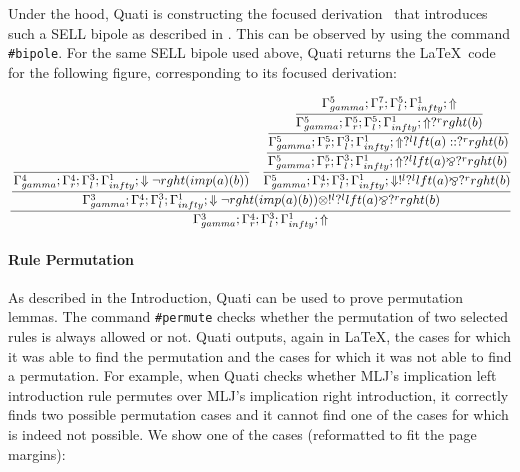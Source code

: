 \documentclass{llncs}
\begin{document}
Under the hood, Quati is constructing the focused derivation~\cite{andreoli92jlc} that introduces such 
a SELL bipole as described in \cite{nigam.jlc}. This can be observed by using the command 
\texttt{\#bipole}. For the same SELL bipole used above, Quati returns
the \LaTeX\ code for the following figure, corresponding to its focused
derivation:
\vspace{-4mm}


{\scriptsize\[\cfrac{\cfrac{\cfrac{}
{\Gamma_{ gamma}^{4} ; \Gamma_{r}^{4} ; \Gamma_{l}^{3} ; \Gamma_{ infty}^{1} ;  \Downarrow \neg rght (imp (a) (b) )  } \quad \cfrac{\cfrac{\cfrac{\cfrac{\Gamma_{ gamma}^{5} ; \Gamma_{r}^{7} ; \Gamma_{l}^{5} ; \Gamma_{ infty}^{1} ;  \Uparrow }
{\Gamma_{ gamma}^{5} ; \Gamma_{r}^{5} ; \Gamma_{l}^{5} ; \Gamma_{ infty}^{1} ;  \Uparrow  ?^{r} rght (b)  }}
{\Gamma_{ gamma}^{5} ; \Gamma_{r}^{5} ; \Gamma_{l}^{3} ; \Gamma_{ infty}^{1} ;  \Uparrow  ?^{l} lft (a)  ::  ?^{r} rght (b) }}
{\Gamma_{ gamma}^{5} ; \Gamma_{r}^{5} ; \Gamma_{l}^{3} ; \Gamma_{ infty}^{1} ;  \Uparrow  ?^{l} lft (a)  \bindnasrepma  ?^{r} rght (b)  }}
{\Gamma_{ gamma}^{5} ; \Gamma_{r}^{4} ; \Gamma_{l}^{3} ; \Gamma_{ infty}^{1} ;  \Downarrow  !^{l}  ?^{l} lft (a)  \bindnasrepma  ?^{r} rght (b)  }}
{\Gamma_{ gamma}^{3} ; \Gamma_{r}^{4} ; \Gamma_{l}^{3} ; \Gamma_{ infty}^{1} ;  \Downarrow \neg rght (imp (a) (b) )  \otimes  !^{l}  ?^{l} lft (a)  \bindnasrepma  ?^{r} rght (b) }}
{\Gamma_{ gamma}^{3} ; \Gamma_{r}^{4} ; \Gamma_{l}^{3} ; \Gamma_{ infty}^{1} ; \Uparrow }\]}


\vspace{-2mm}

\paragraph{Rule Permutation}
As described in the Introduction, Quati can be used to prove permutation lemmas. The command \texttt{\#permute} 
checks whether the permutation of two selected rules is always allowed or not. Quati outputs, again in \LaTeX, the cases for
which it was able to find the permutation and the cases for which it was not able to find a permutation. For example, when Quati 
checks whether MLJ's implication left introduction rule permutes over MLJ's
implication right introduction, it correctly finds two possible
permutation cases and it cannot find one of the cases for which is indeed not possible. We show one of the cases (reformatted to fit the page margins):
\vspace{-3mm}
\end{document}
